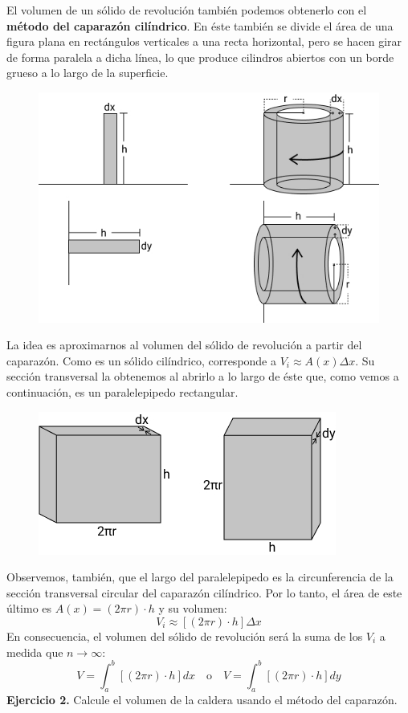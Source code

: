 \documentclass[12pt]{article}
\begin{document}
El volumen de un sólido de revolución también podemos obtenerlo con el \textbf{método del caparazón cilíndrico}. En éste también se divide el área de una figura plana en rectángulos verticales a una recta horizontal, pero se hacen girar de forma paralela a dicha línea, lo que produce cilindros abiertos con un borde grueso a lo largo de la superficie.

\newpage

\begin{figure}[hbt!]
\centering
\includegraphics[scale=0.6]{img/shell-method-4.jpg}
\end{figure}

La idea es aproximarnos al volumen del sólido de revolución a partir del caparazón. Como es un sólido cilíndrico, corresponde a $V_{i} \approx A(x) \Delta x$. Su sección transversal la obtenemos al abrirlo a lo largo de éste que, como vemos a continuación, es un paralelepipedo rectangular.

\begin{figure}[hbt!]
\centering
\includegraphics[scale=0.6]{img/shell-method-5.jpg}
\end{figure}

Observemos, también, que el largo del paralelepipedo es la circunferencia de la sección transversal circular del caparazón cilíndrico. Por lo tanto, el área de este último es $A(x) = (2 \pi r) \cdot h$ y su volumen:
\[
  V_{i} \approx [(2 \pi r) \cdot h] \Delta x
\]
En consecuencia, el volumen del sólido de revolución será la suma de los $V_{i}$ a medida que $n \to \infty$:
\[
  V = \int_{a}^{b} [(2 \pi r) \cdot h] dx \quad \text{o} \quad V = \int_{a}^{b} [(2 \pi r) \cdot h] dy
\]
\textbf{Ejercicio 2.} \quad Calcule el volumen de la caldera usando el método del caparazón.
\end{document}
